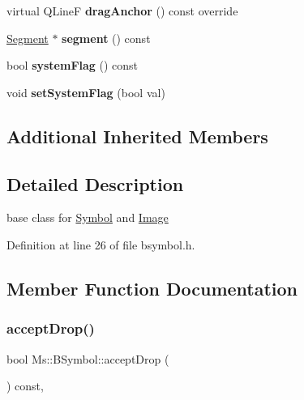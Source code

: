 \begin{DoxyCompactItemize}
\mbox{\label{class_ms_1_1_b_symbol_a9e2b44b692ced87fb7e2a8a358a5c2c8}} 
virtual Q\+LineF {\bfseries drag\+Anchor} () const override
\item 
\mbox{\label{class_ms_1_1_b_symbol_a4def32f584bbe12310779e1163bf5b0f}} 
\hyperlink{class_ms_1_1_segment}{Segment} $\ast$ {\bfseries segment} () const
\item 
\mbox{\label{class_ms_1_1_b_symbol_aa85c778d5f9cfc6fc474baa060694213}} 
bool {\bfseries system\+Flag} () const
\item 
\mbox{\label{class_ms_1_1_b_symbol_ab7de900f7f2eb4ab81c333bd854c2ff3}} 
void {\bfseries set\+System\+Flag} (bool val)
\end{DoxyCompactItemize}
\subsection*{Additional Inherited Members}


\subsection{Detailed Description}
base class for \hyperlink{class_ms_1_1_symbol}{Symbol} and \hyperlink{class_ms_1_1_image}{Image} 

Definition at line 26 of file bsymbol.\+h.



\subsection{Member Function Documentation}
\mbox{\label{class_ms_1_1_b_symbol_afaf2195aeb8f8d2352a593a3bc3cb2d4}} 
\subsubsection{\texorpdfstring{accept\+Drop()}{acceptDrop()}}
{\footnotesize\ttfamily bool Ms\+::\+B\+Symbol\+::accept\+Drop (\begin{DoxyParamCaption}\item[{\hyperlink{class_ms_1_1_edit_data}{Edit\+Data} \&}]{ }\end{DoxyParamCaption}) const\hspace{0.3cm}{\ttfamily [override]}, {\ttfamily [virtual]}}

